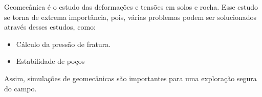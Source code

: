 Geomecânica é o estudo das deformações e tensões em solos e rocha. Esse estudo se torna de extrema importância, pois, várias problemas podem ser solucionados através desses estudos, como:
\begin{itemize}
    \item Cálculo da pressão de fratura.
    \item Estabilidade de poços
\end{itemize}

Assim, simulações de geomecânicas são importantes para uma exploração segura do campo.